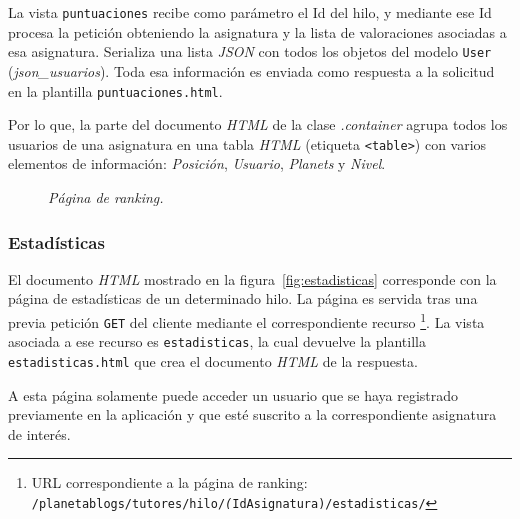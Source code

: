 \documentclass[a4paper, 12pt]{book}
\begin{document}
La vista \texttt{puntuaciones} recibe como par\'ametro el Id del hilo, y mediante ese Id procesa la petici\'on obteniendo la asignatura y la lista 
de valoraciones asociadas a esa asignatura. Serializa una lista \textit{JSON} con todos los objetos del modelo \texttt{User} (\textit{json\_usuarios}).
Toda esa informaci\'on es enviada como respuesta a la solicitud en la plantilla \texttt{puntuaciones.html}. 

Por lo que, la parte del documento \textit{HTML} de la clase \textit{.container} agrupa todos los usuarios de una asignatura en una tabla \textit{HTML} (etiqueta 
\texttt{<table>}) con varios elementos de informaci\'on: \textit{Posici\'on}, \textit{Usuario}, \textit{Planets} y \textit{Nivel}.

\begin{figure}
  \centering
  \caption{\textit{P\'agina de ranking.}}
  \label{fig:ranking}
\end{figure}


\subsubsection{Estad\'isticas} 
\label{sec:estadisticas}
El documento \textit{HTML} mostrado en la figura~\ref{fig:estadisticas} corresponde con la p\'agina de estad\'isticas de un determinado hilo. 
La p\'agina es servida tras una previa petici\'on \texttt{GET} del cliente mediante el correspondiente recurso \footnote{URL correspondiente a la p\'agina de 
ranking: \texttt{/planetablogs/tutores/hilo/\textit(IdAsignatura)/estadisticas/}}. La vista asociada a ese recurso es \texttt{estadisticas}, la cual 
devuelve la plantilla \texttt{estadisticas.html} que crea el documento \textit{HTML} de la respuesta.

A esta p\'agina solamente puede acceder un usuario que se haya registrado previamente en la aplicaci\'on y que est\'e suscrito a la
correspondiente asignatura de inter\'es.
\end{document}

